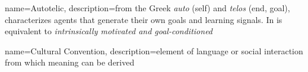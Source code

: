\makeglossaries

{
    name=Autotelic,
    description={from the Greek \textit{auto} (self) and \textit{telos} (end, goal), characterizes agents that generate their own goals and learning signals. In is equivalent to \textit{intrinsically motivated and goal-conditioned}}
}

{
	name=Cultural Convention,
	description={element of language or social interaction from which meaning can be derived}
}
